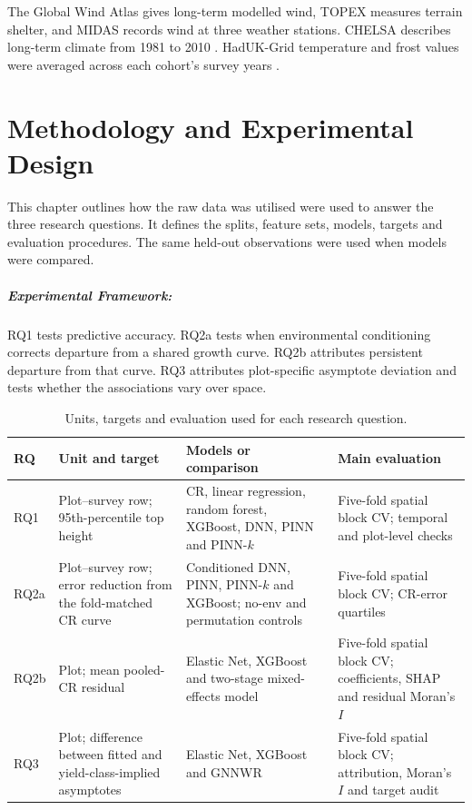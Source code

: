 \documentclass[logo,msc,ai]{infthesis}           %
\begin{document}
The Global Wind Atlas gives long-term modelled wind, TOPEX measures terrain shelter, and MIDAS records wind at three weather stations. CHELSA describes long-term climate from 1981 to 2010 \cite{karger2017CHELSA_C3_LID}. HadUK-Grid temperature and frost values were averaged across each cohort's survey years \cite{hollis2019HadUKGrid_C3_LID}.


\chapter{Methodology and Experimental Design} \label{ch:methodology}
This chapter outlines how the raw data was utilised were used to answer the three research questions. It defines the splits, feature sets, models, targets and evaluation procedures. The same held-out observations were used when models were compared.

\paragraph*{Experimental Framework:}RQ1 tests predictive accuracy. RQ2a tests when environmental conditioning corrects departure
from a shared growth curve. RQ2b attributes persistent departure from that curve. RQ3 attributes
plot-specific asymptote deviation and tests whether the associations vary over space.
\begin{table}[!ht]
\centering
\footnotesize
\renewcommand{\arraystretch}{1.15}

\begin{tabular}{
@{}
>{\raggedright\arraybackslash}p{0.9cm}
>{\raggedright\arraybackslash}p{3.5cm}
>{\raggedright\arraybackslash}p{3.2cm}
>{\raggedright\arraybackslash}p{2.8cm}
@{}
}
\toprule
RQ & Unit and target & Models or comparison & Main evaluation \\
\midrule
RQ1 & Plot--survey row; 95th-percentile top height & CR, linear regression, random forest,
XGBoost, DNN, PINN and PINN-$k$ & Five-fold spatial block CV; temporal and plot-level checks \\
RQ2a & Plot--survey row; error reduction from the fold-matched CR curve & Conditioned
DNN, PINN, PINN-$k$ and XGBoost; no-env and permutation controls & Five-fold spatial block
CV; CR-error quartiles \\
RQ2b & Plot; mean pooled-CR residual & Elastic Net, XGBoost and two-stage
mixed-effects model & Five-fold spatial block CV; coefficients, SHAP and residual Moran's $I$ \\
RQ3 & Plot; difference between fitted and yield-class-implied asymptotes & Elastic Net, XGBoost
and GNNWR & Five-fold spatial block CV; attribution, Moran's $I$ and target audit \\
\bottomrule
\end{tabular}
\caption{Units, targets and evaluation used for each research question.}
\label{tab:rq-framework}
\end{table}
\end{document}
